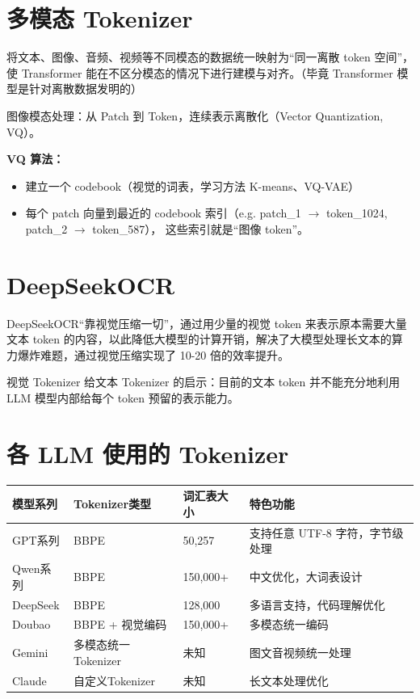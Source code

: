 \documentclass[11pt, a4paper]{article}
\begin{document}
\section{多模态 Tokenizer}

将文本、图像、音频、视频等不同模态的数据统一映射为“同一离散 token 空间”，使 Transformer 能在不区分模态的情况下进行建模与对齐。（毕竟 Transformer 模型是针对离散数据发明的）

图像模态处理：从 Patch 到 Token，连续表示离散化（Vector Quantization, VQ）。

\textbf{VQ 算法：}
\begin{itemize}
    \item 建立一个 codebook（视觉的词表，学习方法 K-means、VQ-VAE）
    \item 每个 patch 向量到最近的 codebook 索引（e.g. patch\_1 $\rightarrow$ token\_1024, patch\_2 $\rightarrow$ token\_587）， 这些索引就是“图像 token”。
\end{itemize}

\section{DeepSeekOCR}

DeepSeekOCR“靠视觉压缩一切”，通过用少量的视觉 token 来表示原本需要大量文本 token 的内容，以此降低大模型的计算开销，解决了大模型处理长文本的算力爆炸难题，通过视觉压缩实现了 10-20 倍的效率提升。

视觉 Tokenizer 给文本 Tokenizer 的启示：目前的文本 token 并不能充分地利用 LLM 模型内部给每个 token 预留的表示能力。

\section{各 LLM 使用的 Tokenizer}

\begin{table}[h]
\centering
\begin{tabularx}{\textwidth}{|l|l|l|X|}
\hline
\textbf{模型系列} & \textbf{Tokenizer类型} & \textbf{词汇表大小} & \textbf{特色功能} \\ \hline
GPT系列 & BBPE & 50,257 & 支持任意 UTF-8 字符，字节级处理 \\ \hline
Qwen系列 & BBPE & 150,000+ & 中文优化，大词表设计 \\ \hline
DeepSeek & BBPE & 128,000 & 多语言支持，代码理解优化 \\ \hline
Doubao & BBPE + 视觉编码 & 150,000+ & 多模态统一编码 \\ \hline
Gemini & 多模态统一Tokenizer & 未知 & 图文音视频统一处理 \\ \hline
Claude & 自定义Tokenizer & 未知 & 长文本处理优化 \\ \hline
\end{tabularx}
\end{table}
\end{document}
